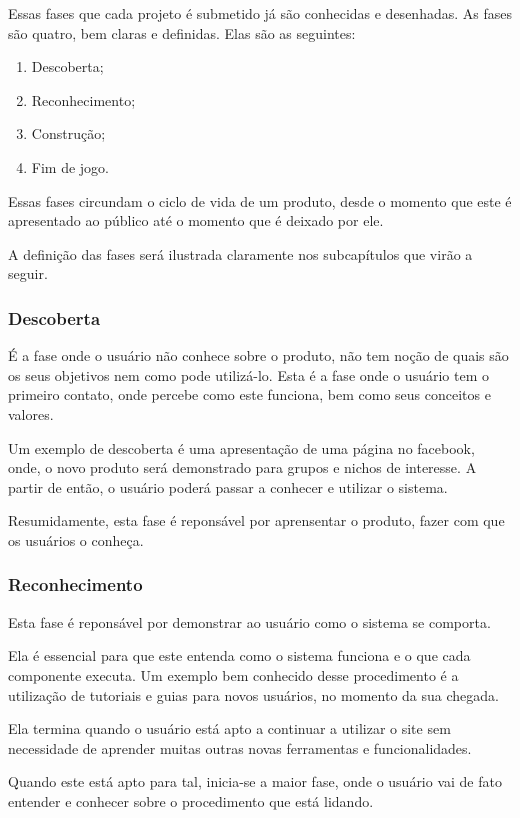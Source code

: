 Essas fases que cada projeto é submetido já são conhecidas e desenhadas. As fases
são quatro, bem claras e definidas. Elas são as seguintes:

\begin{enumerate}
    \item Descoberta;
    \item Reconhecimento;
    \item Construção;
    \item Fim de jogo.
\end{enumerate}

Essas fases circundam o ciclo de vida de um produto, desde o momento que este
é apresentado ao público até o momento que é deixado por ele.

A definição das fases será ilustrada claramente nos subcapítulos que virão a seguir.

\subsubsection{Descoberta}
\label{sub:descoperta}
É a fase onde o usuário não conhece sobre o produto, não tem noção de quais são
os
seus objetivos nem como pode utilizá-lo. Esta é a fase onde o usuário tem o primeiro
contato, onde percebe como este funciona, bem como seus conceitos e valores.

Um exemplo de descoberta é uma apresentação de uma página no facebook, onde,
o novo produto será demonstrado para grupos e nichos de interesse. A partir
de então, o usuário poderá passar a conhecer e utilizar o sistema.

Resumidamente, esta fase é reponsável por aprensentar o produto, fazer
com que os usuários o conheça.

\subsubsection{Reconhecimento}
\label{sub:reconhecimento}
Esta fase é reponsável por demonstrar ao usuário como o sistema se comporta.

Ela é essencial para que este entenda como o sistema funciona e o que cada
componente executa. Um exemplo bem conhecido desse procedimento é a utilização
de tutoriais e guias para novos usuários, no momento da sua chegada.

Ela termina quando o usuário está apto a continuar a utilizar o site sem
necessidade de aprender muitas outras novas ferramentas e funcionalidades.

Quando este está apto para tal, inicia-se a maior fase, onde o usuário
vai de fato entender e conhecer sobre o procedimento que está lidando.

